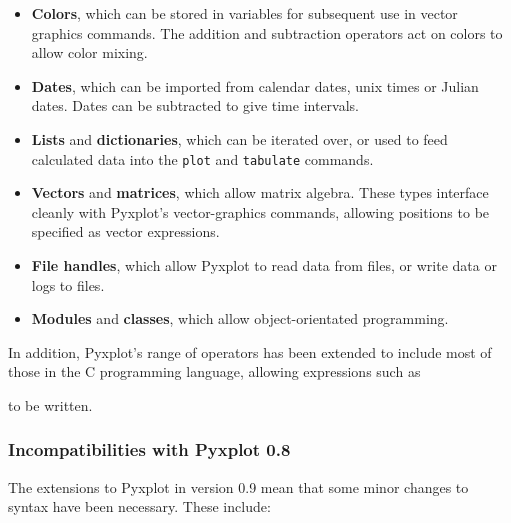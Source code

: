 \begin{itemize}
\item {\bf Colors}, which can be stored in variables for subsequent use in vector graphics commands. The addition and subtraction operators act on colors to allow color mixing.
\item {\bf Dates}, which can be imported from calendar dates, unix times or Julian dates. Dates can be subtracted to give time intervals.
\item {\bf Lists} and {\bf dictionaries}, which can be iterated over, or used to feed calculated data into the {\tt plot} and {\tt tabulate} commands.
\item {\bf Vectors} and {\bf matrices}, which allow matrix algebra. These types interface cleanly with Pyxplot's vector-graphics commands, allowing positions to be specified as vector expressions.
\item {\bf File handles}, which allow Pyxplot to read data from files, or write data or logs to files.
\item {\bf Modules} and {\bf classes}, which allow object-orientated programming.
\end{itemize}

In addition, Pyxplot's range of operators has been extended to include most of those in the C programming language, allowing expressions such as

\vspace{3mm}

\vspace{3mm}

\noindent to be written.

\subsubsection*{Incompatibilities with Pyxplot 0.8}

The extensions to Pyxplot in version 0.9 mean that some minor changes to syntax have been necessary. These include:

